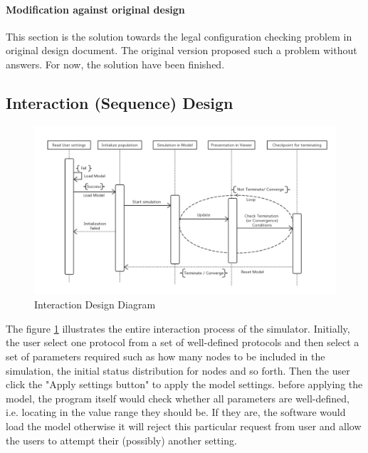 \paragraph{Modification against original design}
This section is the solution towards the legal configuration checking problem in
original design document. The original version proposed such a problem without answers.
For now, the solution have been finished.

\subsection{Interaction (Sequence) Design}
\begin{figure}[H]
\begin{center}
\includegraphics[width =\textwidth]{context/diagram/interaction.pdf}
\caption{Interaction Design Diagram}
\label{interactionG}
\end{center}
\end{figure}

\par\noindent
The figure \ref{interactionG} illustrates the entire interaction process of the
simulator. Initially, the user select one protocol from a set of well-defined
protocols and then select a set of parameters required such as how many nodes to
be included in the simulation, the initial status distribution for nodes and so forth.
Then the user click the "Apply settings button" to apply the model settings. before
applying the model, the program itself would check whether all parameters are
well-defined, i.e. locating in the value range they should be. If they are, the software
would load the model otherwise it will reject this particular request from user and
allow the users to attempt their (possibly) another setting.

